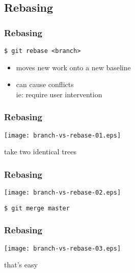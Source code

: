 \documentclass[english]{beamer}
\newcommand{\mysubsection}[2]{%
  \hypertarget{#2}{}%
  \subsection{#1}%
  \label{#2}%
}
\newcommand{\CMD}[1]{%
\texttt{\textcolor{code-green}{#1}}%
}
\newcommand{\faint}[1]{%
\textcolor{code-gray}{#1}%
}
\newcommand{\error}[1]{%
\textcolor{code-red}{#1}%
}
\begin{document}
\mysubsection{Rebasing}{using:rebasing}
\begin{frame}
\frametitle{Rebasing}

\CMD{\$ git rebase <branch>} \\
\begin{itemize}
        \item moves new work onto a new baseline
        \item can cause \error{conflicts} \\
                \faint{ie: require user intervention}
\end{itemize}
\end{frame}

\begin{frame}
\frametitle{Rebasing}

\texttt{[image: branch-vs-rebase-01.eps]}
\vspace{\baselineskip}
\begin{center}
        take two identical trees
\end{center}
\vspace{\textheight}
\end{frame}

\begin{frame}
\frametitle{Rebasing}

\texttt{[image: branch-vs-rebase-02.eps]}
\vspace{\baselineskip}
\begin{flushleft}
        \CMD{\$ git merge master}
\end{flushleft}
\vspace{\textheight}
\end{frame}

\begin{frame}
\frametitle{Rebasing}

\texttt{[image: branch-vs-rebase-03.eps]}
\vspace{\baselineskip}
\begin{center}
        that's easy
\end{center}
\vspace{\textheight}
\end{frame}
\end{document}
